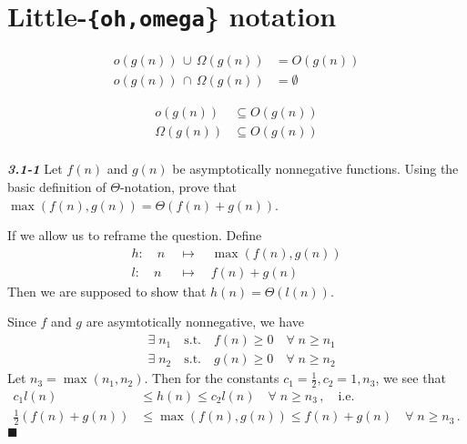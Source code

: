\documentclass{article}
\begin{document}
\section{Little-\texttt{\{oh,omega}\} notation}
  \begin{align*}
		o(g(n))      \,\cup\, \Omega(g(n)) &= O(g(n)) \\
		o(g(n))      \,\cap\, \Omega(g(n)) &= \emptyset
  \end{align*}

  \begin{align*}
    o(g(n))      & \subseteq O(g(n)) \\
    \Omega(g(n)) & \subseteq O(g(n)) \\
  \end{align*}

\noindent
\textbf{\textsl{3.1-1}}
Let $f(n)$ and $g(n)$ be asymptotically nonnegative functions. Using the basic definition of $\Theta$-notation,
prove that $\max\left(f(n), g(n)\right) = \Theta(f(n) + g(n))$.
\newline
\newline

If we allow us to reframe the question. Define
\begin{align*}
	h \!:\quad n \;&\mapsto\quad \max(f(n), g(n)) \\
	l \!:\quad n \;&\mapsto\quad f(n) + g(n)
\end{align*}
Then we are supposed to show that $h(n) = \Theta(l(n))$.

\noindent
Since $f$ and $g$ are asymtotically nonnegative, we have
\begin{align*}
	& \exists\; n_1 \quad\textrm{s.t.}\quad f(n) \ge 0 \quad\forall\; n \ge n_1 \\
	& \exists\; n_2 \quad\textrm{s.t.}\quad g(n) \ge 0 \quad\forall\; n \ge n_2
\end{align*}
Let $n_3 = \max(n_1, n_2)$. Then for the constants $c_1=\frac{1}{2}, c_2=1, n_3$, we see that
\begin{align*}
	c_1 l(n) &\le h(n) \le c_2 l(n) \quad\forall\; n \ge n_3\,, \quad \textrm{i.e.}\\
	\frac{1}{2}(f(n) + g(n)) &\le \max\left(f(n), g(n)\right) \le f(n) + g(n) \quad\forall\; n \ge n_3\,.
\end{align*}
\hfill$\blacksquare$
\end{document}
